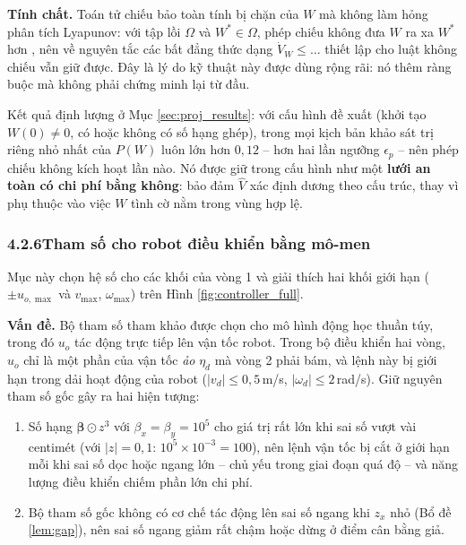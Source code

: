 \documentclass[12pt,a4paper]{article}
\makeatletter
\newcommand{\seclabel}[2]{\phantomsection\protected@edef\@currentlabel{#2}\label{#1}}
\makeatother
\begin{document}
\textbf{Tính chất.} Toán tử chiếu bảo toàn tính bị chặn của $W$ mà không làm hỏng phân tích Lyapunov: với tập lồi $\Omega$ và $W^* \in \Omega$, phép chiếu không đưa $W$ ra xa $W^*$ hơn \cite{Ioannou1996}, nên về nguyên tắc các bất đẳng thức dạng $\dot{V}_W \leq \dots$ thiết lập cho luật không chiếu vẫn giữ được. Đây là lý do kỹ thuật này được dùng rộng rãi: nó thêm ràng buộc mà không phải chứng minh lại từ đầu.

Kết quả định lượng ở Mục \ref{sec:proj_results}: với cấu hình đề xuất (khởi tạo $W(0) \neq 0$, có hoặc không có số hạng ghép), trong mọi kịch bản khảo sát trị riêng nhỏ nhất của $P(W)$ luôn lớn hơn $0{,}12$ -- hơn hai lần ngưỡng $\epsilon_p$ -- nên phép chiếu không kích hoạt lần nào. Nó được giữ trong cấu hình như một \textbf{lưới an toàn có chi phí bằng không}: bảo đảm $\hat V$ xác định dương theo cấu trúc, thay vì phụ thuộc vào việc $W$ tình cờ nằm trong vùng hợp lệ.

\subsubsection*{4.2.6\quad Tham số cho robot điều khiển bằng mô-men}
\seclabel{sec:ft_tuning}{4.2.6}

Mục này chọn hệ số cho các khối của vòng 1 và giải thích hai khối giới hạn ($\pm u_{o,\max}$ và $v_{\max}$, $\omega_{\max}$) trên Hình \ref{fig:controller_full}.

\textbf{Vấn đề.} Bộ tham số tham khảo \cite{Wang2025} được chọn cho mô hình động học thuần túy, trong đó $u_o$ tác động trực tiếp lên vận tốc robot. Trong bộ điều khiển hai vòng, $u_o$ chỉ là một phần của vận tốc \textit{ảo} $\eta_d$ mà vòng 2 phải bám, và lệnh này bị giới hạn trong dải hoạt động của robot ($|v_d| \leq 0{,}5$\,m/s, $|\omega_d| \leq 2$\,rad/s). Giữ nguyên tham số gốc gây ra hai hiện tượng:

\begin{enumerate}
    \item Số hạng $\bm{\beta} \odot z^3$ với $\beta_x = \beta_y = 10^5$ cho giá trị rất lớn khi sai số vượt vài centimét (với $|z| = 0{,}1$: $10^5 \times 10^{-3} = 100$), nên lệnh vận tốc bị cắt ở giới hạn mỗi khi sai số dọc hoặc ngang lớn -- chủ yếu trong giai đoạn quá độ -- và năng lượng điều khiển chiếm phần lớn chi phí.
    \item Bộ tham số gốc không có cơ chế tác động lên sai số ngang khi $z_x$ nhỏ (Bổ đề \ref{lem:gap}), nên sai số ngang giảm rất chậm hoặc dừng ở điểm cân bằng giả.
\end{enumerate}
\end{document}
